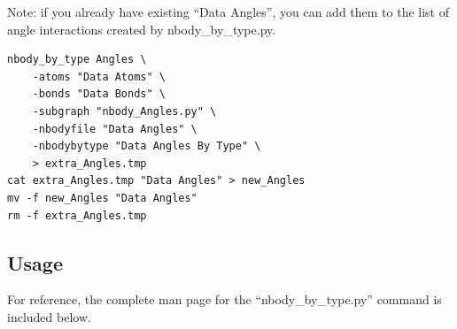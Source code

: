 \documentclass[11pt]{article}
\begin{document}
Note: if you already have existing ``Data Angles'', you can add them to 
the list of angle interactions created by nbody\_by\_type.py.

\begin{verbatim}
nbody_by_type Angles \
    -atoms "Data Atoms" \
    -bonds "Data Bonds" \
    -subgraph "nbody_Angles.py" \
    -nbodyfile "Data Angles" \
    -nbodybytype "Data Angles By Type" \
    > extra_Angles.tmp
cat extra_Angles.tmp "Data Angles" > new_Angles
mv -f new_Angles "Data Angles"
rm -f extra_Angles.tmp
\end{verbatim}


\subsection{Usage}
For reference, the complete man page for the ``nbody\_by\_type.py''
command is included below.
\end{document}
